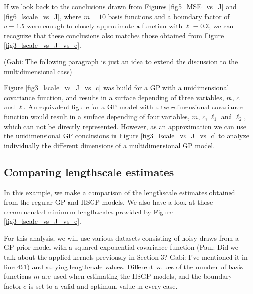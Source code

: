 \documentclass[]{interact}
\theoremstyle{plain}%
\theoremstyle{definition}
\theoremstyle{remark}
\begin{document}
If we look back to the conclusions drawn from Figures \ref{fig5_MSE_vs_J} and \ref{fig6_lscale_vs_J}, where $m = 10$ basis functions and a boundary factor of $c = 1.5$ were enough to closely approximate a function with $\ell = 0.3$, we can recognize that these conclusions also matches those obtained from Figure \ref{fig3_lscale_vs_J_vs_c}.

(Gabi: The following paragraph is just an idea to extend the discussion to the multidimensional case)

Figure \ref{fig3_lscale_vs_J_vs_c} was build for a GP with a unidimensional covariance function, and results in a surface depending of three variables, $m$, $c$ and $\ell$. An equivalent figure for a GP model with a two-dimensional covariance function would result in a surface depending of four variables, $m$, $c$, $\ell_1$ and $\ell_2$, which can not be directly represented. However, as an approximation we can use the unidimensional GP conclusions in Figure \ref{fig3_lscale_vs_J_vs_c} to analyze individually the different dimensions of a multidimensional GP model.

\subsection{Comparing lengthscale estimates}

In this example, we make a comparison of the lengthscale estimates
obtained from the regular GP and HSGP models. We also have a look at those recommended minimum lengthscales provided by Figure \ref{fig3_lscale_vs_J_vs_c}.


For this analysis, we will use various datasets consisting of noisy draws from a GP prior model with a squared exponential covariance function (Paul: Did we talk about the applied kernels previously in Section 3? Gabi: I've mentioned it in line 491) and varying lengthscale values. Different values of the number of basis functions $m$ are used when estimating the HSGP models, and the boundary factor $c$ is set to a valid and optimum value in every case. 
\end{document}
